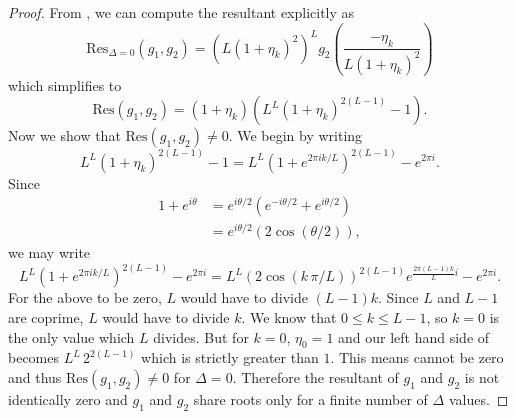 \documentclass[a4paper,11pt]{article}
\theoremstyle{definition}
\begin{document}
\begin{proof}
From \cite{Cox_Little_OShea_1998}, we can compute the resultant explicitly as 
\begin{equation}
    \text{Res}_{\Delta=0}(g_1,g_2)=\left(L(1+\eta_k)^2\right)^L g_2\left(\frac{-\eta_k}{L(1+\eta_k)^2}\right)
\end{equation}
which simplifies to 
\begin{equation}
    \text{Res}(g_1,g_2) = (1+\eta_k)\left(L^L(1+\eta_k)^{2(L-1)}-1\right).
\end{equation}
Now we show that $\text{Res}(g_1,g_2)\neq0$. We begin by writing 
\begin{equation}\label{e: Resultant eqn zero}
    L^L(1+\eta_k)^{2(L-1)}-1=L^L\left(1+e^{2\pi i k /L}\right)^{2(L-1)}-e^{2\pi i}.
\end{equation}
Since
\begin{equation}
    \begin{split}
        1+e^{i\theta} &= e^{i\theta/2}\left(e^{-i\theta/2} + e^{i\theta/2} \right) \\
        &= e^{i\theta/2}(2\cos(\theta/2)),
    \end{split}
\end{equation}
we may write 
\begin{equation}
    L^L\left(1+e^{2\pi i k /L}\right)^{2(L-1)}-e^{2\pi i}=L^L\left(2\cos(k\, \pi/L) \right)^{2(L-1)}e^{\frac{2\pi(L-1)k}{L} i}-e^{2\pi i}. 
\end{equation}
For the above to be zero, $L$ would have to divide $(L-1)k$. Since $L$ and $L-1$ are coprime, $L$ would have to divide $k$. We know that $0\leq k\leq L-1$, so $k=0$ is the only value which $L$ divides. But for $k=0$, $\eta_0=1$ and our left hand side of  becomes $L^L\,2^{2(L-1)}$ which is strictly greater than $1$. This means  cannot be zero and thus $\text{Res}(g_1,g_2)\neq0$ for $\Delta=0$. Therefore the resultant of $g_1$ and $g_2$ is not identically zero and $g_1$ and $g_2$ share roots only for a finite number of $\Delta$ values.
\end{proof}
\end{document}
